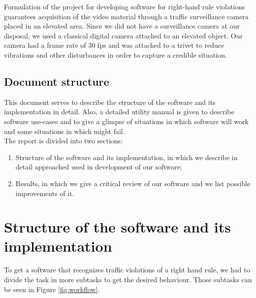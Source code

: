 \documentclass[12pt]{article} %
\begin{document}
Formulation of the project for developing software for right-hand rule violations guarantees acquisition of the video material through a traffic surveillance camera placed in an elevated area. 
Since we did not have a surveillance camera at our disposal, we used a classical digital camera attached to an elevated object. Our camera had a frame rate of 30 fps and was attached to a trivet to reduce vibrations and other disturbances in order to capture a credible situation.




\subsection{Document structure}

This document serves to describe the structure of the software and its implementation in detail. Also, a detailed utility manual is given to describe software use-cases and to give a glimpse of situations in which software will work and some situations in which might fail.
\\

The report is divided into two sections:
\begin{enumerate}
\item Structure of the software and its implementation, in which we describe in detail approached used in development of our software;
\item Results, in which we give a critical review of our software and we list possible improvements of it. 
\end{enumerate}




\section{Structure of the software and its implementation} %

To get a software that recognizes traffic violations of a right hand rule, we had to divide the task in more subtasks to get the desired behaviour. Those subtasks can be seen in Figure \ref{fig:workflow}.
\end{document}
